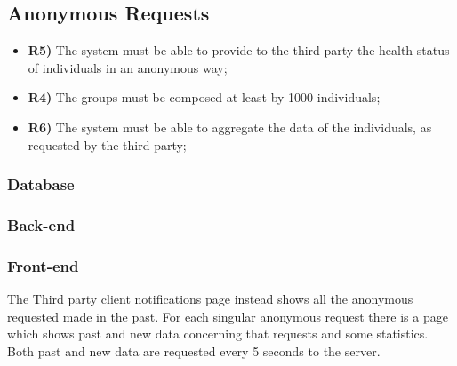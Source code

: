\subsection{Anonymous Requests}	
\begin{itemize}
	\item {\color{Green}\textbf{R5)}} The system must be able to provide to the third party the health status of individuals
in an anonymous way;
	\item {\color{Green}\textbf{R4)}} The groups must be composed at least by 1000 individuals;
	\item {\color{Green}\textbf{R6)}} The system must be able to aggregate the data of the individuals, as requested by the
third party;
\end{itemize}
\subsubsection*{Database}


\subsubsection*{Back-end}


\subsubsection*{Front-end}
The Third party client notifications page instead shows all the anonymous requested made in the past. For each singular anonymous request there is a page which shows past and new data concerning that requests and some statistics. Both past and new data are requested every 5 seconds to the server.